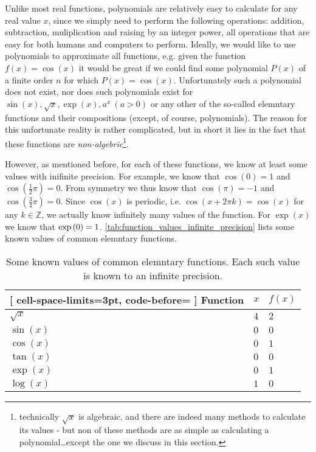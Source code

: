 Unlike most real functions, polynomials are relatively easy to calculate for any real value $x$, since we simply need to perform the following operations: addition, subtraction, muliplication and raising by an integer power, all operations that are easy for both humans and computers to perform. Ideally, we would like to use polynomials to approximate all functions, e.g. given the function $f(x) = \cos(x)$ it would be great if we could find some polynomial $P(x)$ of a finite order $n$ for which $P(x)=\cos(x)$. Unfortunately such a polynomial does not exist, nor does such polynomials exist for $\sin(x), \sqrt{x}, \exp(x), a^{x}\ \left(a>0\right)$ or any other of the so-called elemntary functions and their compositions (except, of course, polynomials). The reason for this unfortunate reality is rather complicated, but in short it lies in the fact that these functions are \textit{non-algebric}\footnote{technically $\sqrt{x}$ is algebraic, and there are indeed many methods to calculate its values - but non of these methods are as simple as calculating a polynomial\dots except the one we discuss in this section.}.

However, as mentioned before, for each of these functions, we know at least some values with inifinite precision. For example, we know that $\cos(0)=1$ and $\cos\left(\frac{1}{2}\pi\right)=0$. From symmetry we thus know that $\cos(\pi)=-1$ and $\cos\left(\frac{3}{4}\pi\right)=0$. Since $\cos(x)$ is periodic, i.e. $\cos\left(x+2\pi k\right)=\cos(x)$ for any $k\in\mathbb{Z}$, we actually know infinitely many values of the function. For $\exp(x)$ we know that $\exp\left(0\right)=1$. \autoref{tab:function_values_infinite_precision} lists some known values of common elemntary functions.

\begin{table}[htpb]
	\centering
	\caption{Some known values of common elemntary functions. Each such value is known to an infinite precision.}
	\label{tab:function_values_infinite_precision}
	\begin{NiceTabular}{lll}[
			cell-space-limits=3pt, code-before= 
		]
		\toprule
		\RowStyle{\bfseries} Function & $x$ & $f(x)$\\
		\midrule
    $\sqrt{x}$ & $4$ & $2$\\
    $\sin(x)$ & $0$ & $0$\\
    $\cos(x)$ & $0$ & $1$\\
    $\tan(x)$ & $0$ & $0$\\
    $\exp(x)$ & $0$ & $1$\\
    $\log(x)$ & $1$ & $0$\\
		\bottomrule
	\end{NiceTabular}
\end{table}


